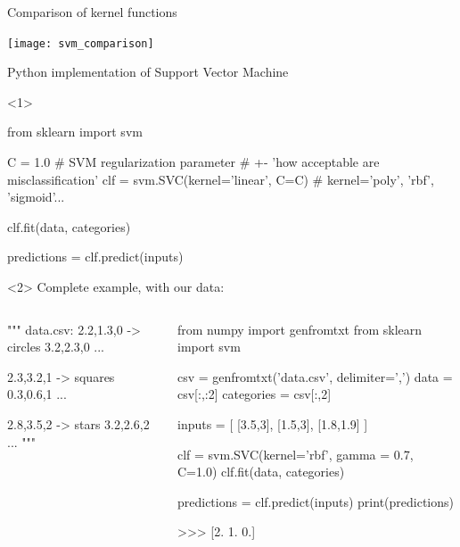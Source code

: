 \documentclass[compress,xcolor=table]{beamer}
\begin{document}
\begin{frame}{Comparison of kernel functions}
    \begin{center}
        \texttt{[image: svm\_comparison]}
    \end{center}
\end{frame}

\begin{frame}[fragile]{Python implementation of Support Vector Machine}

\begin{onlyenv}<1>

\begin{pythoncode}
from sklearn import svm

C = 1.0  # SVM regularization parameter 
         # +- 'how acceptable are misclassification'
clf = svm.SVC(kernel='linear', C=C) # kernel='poly', 'rbf', 'sigmoid'...

clf.fit(data, categories)

predictions = clf.predict(inputs)
\end{pythoncode}

\end{onlyenv}

\begin{onlyenv}<2>
    Complete example, with our data:

\begin{columns}
    \begin{column}{0.4\linewidth}
\begin{pythoncode}
""" data.csv:
2.2,1.3,0 -> circles
3.2,2.3,0
...

2.3,3.2,1 -> squares
0.3,0.6,1
...

2.8,3.5,2 -> stars
3.2,2.6,2
...
"""
\end{pythoncode}
        
    \end{column}
    \begin{column}{0.6\linewidth}
\begin{pythoncode}
from numpy import genfromtxt
from sklearn import svm

csv = genfromtxt('data.csv', delimiter=',')
data = csv[:,:2]
categories = csv[:,2]


inputs = [ [3.5,3], [1.5,3], [1.8,1.9] ]

clf = svm.SVC(kernel='rbf',
              gamma = 0.7,
              C=1.0)
clf.fit(data, categories)

predictions = clf.predict(inputs)
print(predictions)

>>>  [2.  1.  0.]

\end{pythoncode}
    \end{column}
\end{columns}

\end{onlyenv}


\end{frame}
\end{document}
